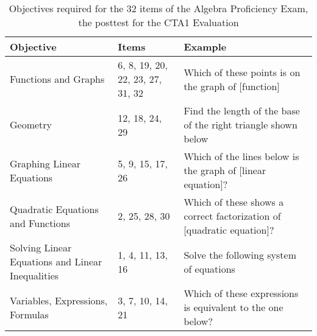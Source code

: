 \begin{table*}[ht]
\centering
\begin{tabular}{p{2.5in}p{1in}p{2.5in}}
  \hline
Objective & Items & Example \\ 
  \hline
Functions and Graphs & 6, 8, 19, 20, 22, 23, 27, 31, 32 & Which of these points is on the graph of [function] \\ 
  Geometry & 12, 18, 24, 29 & Find the length of the base of the right triangle shown below \\ 
  Graphing Linear Equations & 5, 9, 15, 17, 26 & Which of the lines below is the graph of [linear equation]? \\ 
  Quadratic Equations and Functions & 2, 25, 28, 30 & Which of these shows a correct factorization of [quadratic equation]? \\ 
  Solving Linear Equations and Linear Inequalities & 1, 4, 11, 13, 16 & Solve the following system of equations \\ 
  Variables, Expressions, Formulas & 3, 7, 10, 14, 21 & Which of these expressions is equivalent to the one below? \\ 
   \hline
\end{tabular}
\caption{Objectives required for the 32 items of the Algebra Proficiency
  Exam, the posttest for the CTA1 Evaluation} 
\label{tab:ctSkills}
\end{table*}
